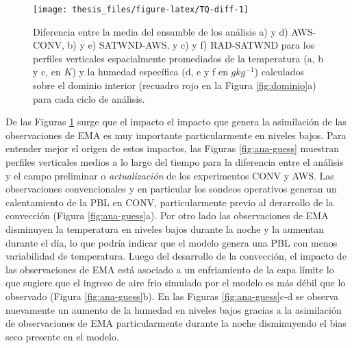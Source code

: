 \documentclass[12pt,oneside,a4paper]{reedthesis}
\begin{document}
\begin{figure}

\texttt{[image: thesis\_files/figure-latex/TQ-diff-1]} \hfill{}

\caption{Diferencia entre la media del ensamble de los análisis a) y d) AWS-CONV, b) y e) SATWND-AWS, y c) y f) RAD-SATWND para los perfiles verticales espacialmente promediados de la temperatura (a, b y c, en \(K\)) y la humedad específica (d, e y f en \(gkg^{-1}\)) calculados sobre el dominio interior (recuadro rojo en la Figura \ref{fig:dominio}a) para cada ciclo de análisis.}\label{fig:TQ-diff}
\end{figure}
De las Figuras \ref{fig:TQ-diff} surge que el impacto el impacto que genera la asimilación de las observaciones de EMA es muy importante particularmente en niveles bajos. Para entender mejor el origen de estos impactos, las Figuras \ref{fig:ana-guess} muestran perfiles verticales medios a lo largo del tiempo para la diferencia entre el análisis y el campo preliminar o \emph{actualización} de los experimentos CONV y AWS. Las observaciones convencionales y en particular los sondeos operativos generan un calentamiento de la PBL en CONV, particularmente previo al derarrollo de la convección (Figura \ref{fig:ana-guess}a). Por otro lado las observaciones de EMA disminuyen la temperatura en niveles bajos durante la noche y la aumentan durante el día, lo que podría indicar que el modelo genera una PBL con menos variabilidad de temperatura. Luego del desarrollo de la convección, el impacto de las observaciones de EMA está asociado a un enfriamiento de la capa límite lo que sugiere que el ingreso de aire frio simulado por el modelo es más débil que lo observado (Figura \ref{fig:ana-guess}b). En las Figuras \ref{fig:ana-guess}c-d se observa nuevamente un aumento de la humedad en niveles bajos gracias a la asimilación de observaciones de EMA particularmente durante la noche disminuyendo el bias seco presente en el modelo.
\end{document}
